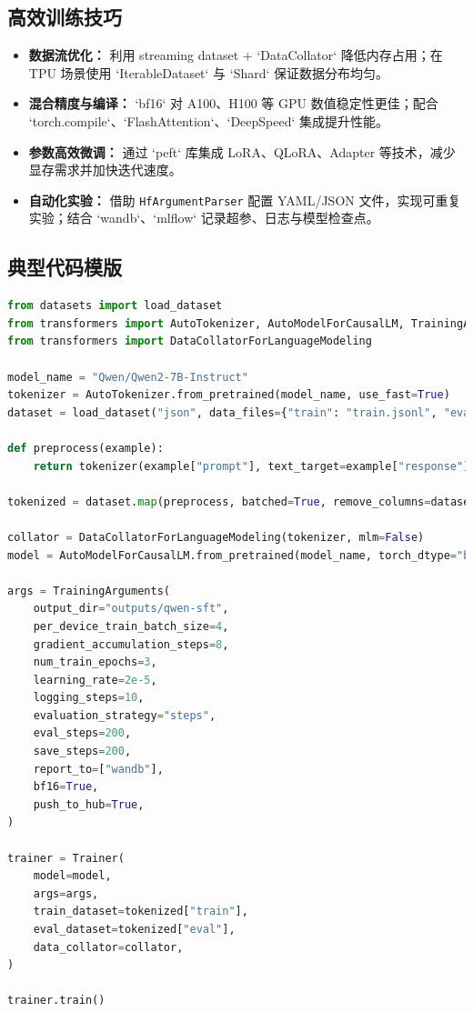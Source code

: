 \documentclass[UTF8,zihao=-4]{ctexart}
\begin{document}
\subsection{高效训练技巧}
\begin{itemize}
  \item \textbf{数据流优化：} 利用 streaming dataset + `DataCollator` 降低内存占用；在 TPU 场景使用 `IterableDataset` 与 `Shard` 保证数据分布均匀。
  \item \textbf{混合精度与编译：} `bf16` 对 A100、H100 等 GPU 数值稳定性更佳；配合 `torch.compile`、`FlashAttention`、`DeepSpeed` 集成提升性能。
  \item \textbf{参数高效微调：} 通过 `peft` 库集成 LoRA、QLoRA、Adapter 等技术，减少显存需求并加快迭代速度。
  \item \textbf{自动化实验：} 借助 \texttt{HfArgumentParser} 配置 YAML/JSON 文件，实现可重复实验；结合 `wandb`、`mlflow` 记录超参、日志与模型检查点。
\end{itemize}

\subsection{典型代码模版}
\begin{lstlisting}[language=Python,caption={使用 Trainer 进行指令微调示例}]
from datasets import load_dataset
from transformers import AutoTokenizer, AutoModelForCausalLM, TrainingArguments, Trainer
from transformers import DataCollatorForLanguageModeling

model_name = "Qwen/Qwen2-7B-Instruct"
tokenizer = AutoTokenizer.from_pretrained(model_name, use_fast=True)
dataset = load_dataset("json", data_files={"train": "train.jsonl", "eval": "eval.jsonl"})

def preprocess(example):
    return tokenizer(example["prompt"], text_target=example["response"], truncation=True)

tokenized = dataset.map(preprocess, batched=True, remove_columns=dataset["train"].column_names)

collator = DataCollatorForLanguageModeling(tokenizer, mlm=False)
model = AutoModelForCausalLM.from_pretrained(model_name, torch_dtype="bfloat16")

args = TrainingArguments(
    output_dir="outputs/qwen-sft",
    per_device_train_batch_size=4,
    gradient_accumulation_steps=8,
    num_train_epochs=3,
    learning_rate=2e-5,
    logging_steps=10,
    evaluation_strategy="steps",
    eval_steps=200,
    save_steps=200,
    report_to=["wandb"],
    bf16=True,
    push_to_hub=True,
)

trainer = Trainer(
    model=model,
    args=args,
    train_dataset=tokenized["train"],
    eval_dataset=tokenized["eval"],
    data_collator=collator,
)

trainer.train()
\end{lstlisting}
\end{document}
